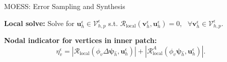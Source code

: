 \documentclass{beamer}
\newcounter{sectionframecount}
\begin{document}
\begin{frame}[t]{MOESS: Error Sampling and Synthesis}

{
\textbf{Local solve:} Solve for $\boldsymbol{u}_h^\epsilon \in \mathcal{V}_{h,p}^\epsilon$ s.t. $\mathcal{R}_{\text{local}}(\boldsymbol{v}_h^\epsilon,\boldsymbol{u}_h^\epsilon) = 0,~~~\forall \boldsymbol{v}_h^\epsilon \in \mathcal{V}_{h,p}^\epsilon$.
}


{
\vspace{4.7cm}
\textbf{Nodal indicator for vertices in inner patch:}
\begin{equation}
  \eta_v^\epsilon = |\mathcal{R}_\text{local}(\phi_v \Delta \boldsymbol{\psi}_{\hat{h}},\boldsymbol{u}_h^\epsilon)| + |\mathcal{R}_\text{local}^A(\phi_v\boldsymbol{\psi}_{\hat{h}},\boldsymbol{u}^\epsilon_h)|.
  \label{e:dwr_ind_base_local}
\end{equation}
}
\end{frame}

\end{document}
